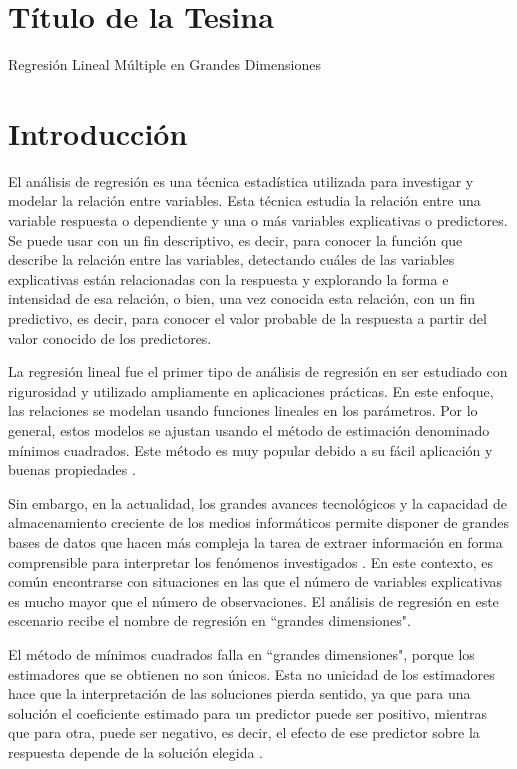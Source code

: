\documentclass[a4paper,12pt]{article}
\begin{document}
\section*{Título de la Tesina}
%
{\Large{Regresión Lineal Múltiple en Grandes Dimensiones}}

\nocite{*}

\section{Introducción}
El análisis de regresión es una técnica estadística utilizada para investigar y modelar la relación entre variables. Esta técnica estudia la relación entre una variable respuesta o dependiente y una o más variables explicativas o predictores. Se puede usar con un fin descriptivo, es decir, para conocer la función que describe la relación entre las variables, detectando cuáles de las variables explicativas están relacionadas con la respuesta y explorando la forma e intensidad de esa relación, o bien, una vez conocida esta relación, con un fin predictivo, es decir, para conocer el valor probable de la respuesta a partir del valor conocido de los predictores.

La regresión lineal fue el primer tipo de análisis de regresión en ser estudiado con rigurosidad y utilizado ampliamente en aplicaciones prácticas. En este enfoque, las relaciones se modelan usando funciones lineales en los parámetros. Por lo general, estos modelos se ajustan usando el método de estimación denominado mínimos cuadrados. Este método es muy popular debido a su fácil aplicación y buenas propiedades \citep{montgomery2015introduction}.

Sin embargo, en la actualidad, los grandes avances tecnológicos y la capacidad de almacenamiento creciente de los medios informáticos permite disponer de grandes bases de datos que hacen más compleja la tarea de extraer información en forma comprensible para interpretar los fenómenos investigados \citep{nisbet2009handbook} \citep{han2011data} \citep{leskovec2014mining} \citep{larose2015data}. En este contexto, es común encontrarse con situaciones en las que el número de variables explicativas es mucho mayor que el número de observaciones. El análisis de regresión en este escenario recibe el nombre de regresión en ``grandes dimensiones".

El método de mínimos cuadrados falla en ``grandes dimensiones", porque los estimadores que se obtienen no son únicos. Esta no unicidad de los estimadores hace que la interpretación de las soluciones pierda sentido, ya que para una solución el coeficiente estimado para un predictor puede ser positivo, mientras que para otra, puede ser negativo, es decir, el efecto de ese predictor sobre la respuesta depende de la solución elegida \citep{friedman2001elements}.
\end{document}
